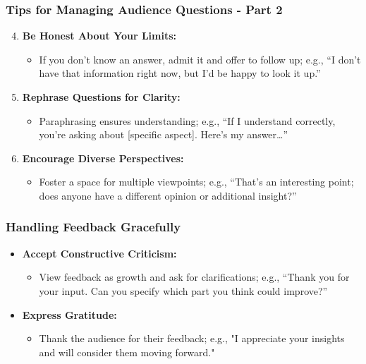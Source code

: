 \documentclass{beamer}
\begin{document}
\begin{frame}[fragile]
    \frametitle{Tips for Managing Audience Questions - Part 2}
    \begin{enumerate}
        \setcounter{enumi}{3}
        \item \textbf{Be Honest About Your Limits:}
            \begin{itemize}
                \item If you don’t know an answer, admit it and offer to follow up; e.g., “I don’t have that information right now, but I’d be happy to look it up.”
            \end{itemize}

        \item \textbf{Rephrase Questions for Clarity:}
            \begin{itemize}
                \item Paraphrasing ensures understanding; e.g., “If I understand correctly, you’re asking about [specific aspect]. Here’s my answer…”
            \end{itemize}

        \item \textbf{Encourage Diverse Perspectives:}
            \begin{itemize}
                \item Foster a space for multiple viewpoints; e.g., “That’s an interesting point; does anyone have a different opinion or additional insight?”
            \end{itemize}
    \end{enumerate}
\end{frame}

\begin{frame}[fragile]
    \frametitle{Handling Feedback Gracefully}
    \begin{itemize}
        \item \textbf{Accept Constructive Criticism:}
            \begin{itemize}
                \item View feedback as growth and ask for clarifications; e.g., “Thank you for your input. Can you specify which part you think could improve?”
            \end{itemize}

        \item \textbf{Express Gratitude:}
            \begin{itemize}
                \item Thank the audience for their feedback; e.g., "I appreciate your insights and will consider them moving forward."
            \end{itemize}
    \end{itemize}
\end{frame}
\end{document}
